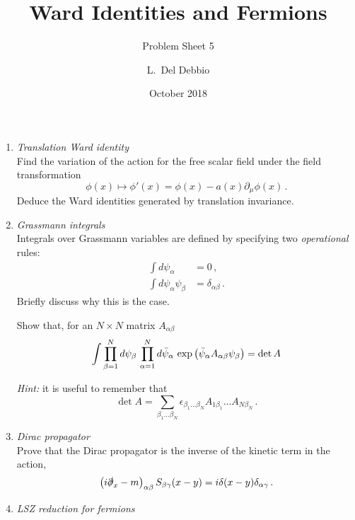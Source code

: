 \documentclass{tutorial}
\subtitle{Problem Sheet 5}
\title{Ward Identities and Fermions}
\author{L.~Del Debbio}
\date{October 2018}
\begin{document}
\maketitle

\begin{enumerate}
  \item \emph{ Translation Ward identity} \\
    
    Find the variation of the action for the free scalar field under
    the field transformation
    \[
    \phi(x) \mapsto \phi'(x) = \phi(x) - a(x) \partial_\mu \phi(x)\, .
    \]
    Deduce the Ward identities generated by translation invariance. 

    \bigskip
    
  \item \emph{ Grassmann integrals}\\

    Integrals over Grassmann variables are defined by specifying two
    {\em operational} rules:
    \begin{align}
      \int d\psi_\alpha &= 0\, , \nonumber \\
      \int d\psi_\alpha \psi_\beta &= \delta_{\alpha\beta}\, . \nonumber
    \end{align}
    Briefly discuss why this is the case.

    Show that, for an $N\times N$ matrix $A_{\alpha\beta}$ 
    \[
    \int \prod_{\beta=1}^N d\psi_\beta\,
    \prod_{\alpha=1}^N d\bar{\psi}_\alpha\,
    \exp\left(
      \bar{\psi}_\alpha A_{\alpha\beta} \psi_\beta
      \right) = \det A
    \]
    
    {\em Hint:} it is useful to remember that 
    \[
    \det A = \sum_{\beta_1\ldots \beta_N} 
    \epsilon_{\beta_1\ldots\beta_N} 
    A_{1\beta_1} \ldots A_{N\beta_N}\, .
    \]

    \bigskip

    \item \emph{ Dirac propagator} \\
      
      Prove that the Dirac propagator is the inverse of the kinetic
      term in the action, \ie
      \[
      \left(i \slashed{\partial}_x -m \right)_{\alpha\beta}
      S_{\beta\gamma}(x-y) = i \delta(x-y) \delta_{\alpha\gamma}\, .
      \]

  \item \emph{ LSZ reduction for fermions}\\
    

\end{enumerate}
\end{document}
